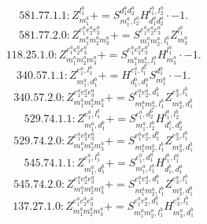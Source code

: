\documentclass[letterpaper,10pt,fleqn,leqno,onecolumn]{article}
\begin{document}
\begin{equation} \;\;\;\;\;\;  581.77.1.1: Z^{l_{1}^{a}}_{m_{1}^{a}}+=S^{d_{1}^{a}d_{2}^{a}}_{m_{1}^{a},l_{2}^{a}}H^{l_{1}^{a},l_{2}^{a}}_{d_{1}^{a}d_{2}^{a}}\cdot -1. \end{equation}
\begin{equation} \;\;\;\;\;\;  581.77.2.0: Z^{e_{1}^{a}e_{2}^{a}e_{3}^{a}}_{m_{1}^{a}m_{2}^{a}m_{3}^{a}}+=S^{e_{1}^{a}e_{2}^{a}e_{3}^{a}}_{m_{1}^{a}m_{2}^{a},l_{1}^{a}}Z^{l_{1}^{a}}_{m_{3}^{a}} \end{equation}
\begin{equation} \;\;\;\;\;\;  118.25.1.0: Z^{e_{1}^{a}e_{2}^{a}e_{3}^{a}}_{m_{1}^{a}m_{2}^{a}m_{3}^{a}}+=S^{e_{1}^{a}e_{2}^{a}e_{3}^{a}}_{m_{1}^{a}m_{2}^{a},l_{1}^{a}}H^{l_{1}^{a}}_{m_{3}^{a}}\cdot -1. \end{equation}
\begin{equation} \;\;\;\;\;\;  340.57.1.1: Z^{e_{1}^{a},l_{1}^{b}}_{m_{1}^{a},d_{1}^{b}}+=H^{e_{1}^{a},l_{1}^{b}}_{d_{1}^{b},d_{1}^{a}}S^{d_{1}^{a}}_{m_{1}^{a}}\cdot -1. \end{equation}
\begin{equation} \;\;\;\;\;\;  340.57.2.0: Z^{e_{1}^{a}e_{2}^{a}e_{3}^{a}}_{m_{1}^{a}m_{2}^{a}m_{3}^{a}}+=S^{e_{1}^{a}e_{2}^{a},d_{1}^{b}}_{m_{1}^{a}m_{2}^{a},l_{1}^{b}}Z^{e_{3}^{a},l_{1}^{b}}_{m_{3}^{a},d_{1}^{b}} \end{equation}
\begin{equation} \;\;\;\;\;\;  529.74.1.1: Z^{e_{1}^{a},l_{1}^{b}}_{m_{1}^{a},d_{1}^{b}}+=S^{e_{1}^{a},d_{2}^{b}}_{m_{1}^{a},l_{2}^{b}}H^{l_{1}^{b},l_{2}^{b}}_{d_{1}^{b},d_{2}^{b}} \end{equation}
\begin{equation} \;\;\;\;\;\;  529.74.2.0: Z^{e_{1}^{a}e_{2}^{a}e_{3}^{a}}_{m_{1}^{a}m_{2}^{a}m_{3}^{a}}+=S^{e_{1}^{a}e_{2}^{a},d_{1}^{b}}_{m_{1}^{a}m_{2}^{a},l_{1}^{b}}Z^{e_{3}^{a},l_{1}^{b}}_{m_{3}^{a},d_{1}^{b}} \end{equation}
\begin{equation} \;\;\;\;\;\;  545.74.1.1: Z^{e_{1}^{a},l_{1}^{b}}_{m_{1}^{a},d_{1}^{b}}+=S^{e_{1}^{a},d_{1}^{a}}_{m_{1}^{a},l_{1}^{a}}H^{l_{1}^{b},l_{1}^{a}}_{d_{1}^{b},d_{1}^{a}} \end{equation}
\begin{equation} \;\;\;\;\;\;  545.74.2.0: Z^{e_{1}^{a}e_{2}^{a}e_{3}^{a}}_{m_{1}^{a}m_{2}^{a}m_{3}^{a}}+=S^{e_{1}^{a}e_{2}^{a},d_{1}^{b}}_{m_{1}^{a}m_{2}^{a},l_{1}^{b}}Z^{e_{3}^{a},l_{1}^{b}}_{m_{3}^{a},d_{1}^{b}} \end{equation}
\begin{equation} \;\;\;\;\;\;  137.27.1.0: Z^{e_{1}^{a}e_{2}^{a}e_{3}^{a}}_{m_{1}^{a}m_{2}^{a}m_{3}^{a}}+=S^{e_{1}^{a}e_{2}^{a},d_{1}^{b}}_{m_{1}^{a}m_{2}^{a},l_{1}^{b}}H^{e_{3}^{a},l_{1}^{b}}_{m_{3}^{a},d_{1}^{b}} \end{equation}
\end{document}
